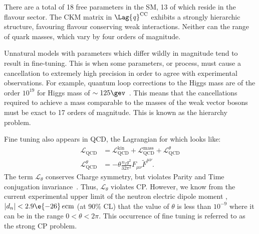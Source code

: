 There are a total of 18 free parameters in the SM, 13 of which reside in the flavour sector.
The CKM matrix in $\Lag{\it q}^\mathrm{CC}$ exhibits a strongly hierarchic structure, favouring
flavour conserving weak interactions.
Neither can the range of quark masses, which vary by four orders of magnitude.

Unnatural models with parameters which differ wildly in magnitude tend to result in fine-tuning.
This is when some parameters, or process, must cause a cancellation to extremely high precision in
order to agree with experimental observations.
For example, quantum loop corrections to the Higgs mass are of the order $10^{19}$ for Higgs mass
of $\sim125\gev$~\cite{Chatrchyan:2012ufa,Aad:2012tfa}.
This means that the cancellations required to achieve a mass comparable to the masses of the weak
vector bosons must be exact to 17 orders of magnitude.
This is known as the hierarchy problem.

Fine tuning also appears in QCD, the Lagrangian for which looks like:
\begin{align}
  \mathcal{L}_\mathrm{QCD} &=
  \mathcal{L}_\mathrm{QCD}^\mathrm{kin} +
  \mathcal{L}_\mathrm{QCD}^\mathrm{mass} +
  \mathcal{L}_\mathrm{QCD}^\theta \\
  \mathcal{L}_\mathrm{QCD}^\theta &=
  -\theta\frac{n_fg^2}{32\pi^2}F_{\mu\nu}\widetilde F^{\mu\nu}.
\end{align}
The term $\mathcal{L}_\theta$ conserves Charge symmetry, but violates Parity and Time conjugation
invariance~\cite{Peccei:2006as}.
Thus, $\mathcal{L}_\theta$ violates CP.
However, we know from the current experimental upper limit of the neutron electric dipole moment
\cite{Baker:2006ts},
$|d_n| <2.9\e{-26}\,e\mathrm{cm}$ (at 90\% CL) that the value of $\theta$ is less than $10^{-9}$
where it can be in the range $0<\theta<2\pi$.
This occurrence of fine tuning is referred to as the strong CP problem.



